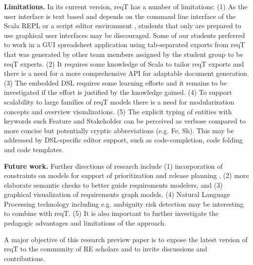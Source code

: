 \documentclass[a4paper]{llncs}
\begin{document}
{\bf Limitations. } In its current version, reqT has a number of limitations: (1) As the user interface is text based and depends on the command line interface of the Scala REPL or a script editor environment \cite{kojo, eclipse}, students that only are prepared to use graphical user interfaces may be discouraged. Some of our students preferred to work in a GUI spreadsheet application using tab-separated exports from reqT that was generated by other team members assigned by the student group to be reqT experts. (2) It requires some knowledge of Scala to tailor reqT exports and there is a need for a more comprehensive API for adaptable document generation. (3) The embedded DSL requires some learning efforts and it remains to be investigated if the effort is justified by the knowledge gained. (4) To support scalability to large families of reqT models there is a need for modularization concepts and overview visualizations. (5) The explicit typing of entities with keywords such Feature and Stakeholder can be perceived as verbose compared to more concise but potentially cryptic abbreviations (e.g. Fe, Sh). This may be addressed by DSL-specific editor support, such as code-completion, code folding and code templates.        


{\bf Future work.} Further directions of research include (1) incorporation of constraints on models for support of prioritization and release planning \cite{Regnell2011}, (2) more elaborate semantic checks to better guide requirements modelers, and (3) graphical visualization of requirements graph models. (4) Natural Language Processing technology including e.g. ambiguity risk detection may be interesting to combine with reqT. (5) It is also important to further investigate the pedagogic advantages and limitations of the approach. 

A major objective of this research preview paper is to expose the latest version of reqT to the community of RE scholars and to invite discussions and contributions.



\end{document}
